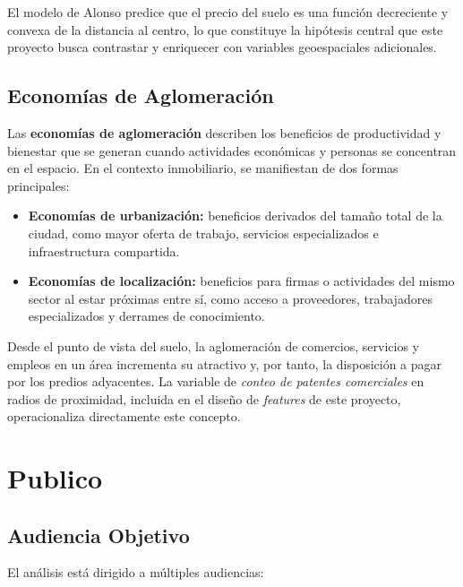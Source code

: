 \documentclass[12pt, letterpaper]{article}
\begin{document}
El modelo de Alonso predice que el precio del suelo es una función decreciente
y convexa de la distancia al centro, lo que constituye la hipótesis central que
este proyecto busca contrastar y enriquecer con variables geoespaciales
adicionales.

\subsection{Economías de Aglomeración}

Las \textbf{economías de aglomeración} describen los beneficios de productividad
y bienestar que se generan cuando actividades económicas y personas se concentran
en el espacio. En el contexto inmobiliario, se manifiestan de dos formas
principales:

\begin{itemize}[leftmargin=1.5em, itemsep=0.3em]
  \item \textbf{Economías de urbanización:} beneficios derivados del tamaño
        total de la ciudad, como mayor oferta de trabajo, servicios especializados
        e infraestructura compartida.
  \item \textbf{Economías de localización:} beneficios para firmas o actividades
        del mismo sector al estar próximas entre sí, como acceso a proveedores,
        trabajadores especializados y derrames de conocimiento.
\end{itemize}

Desde el punto de vista del suelo, la aglomeración de comercios, servicios y
empleos en un área incrementa su atractivo y, por tanto, la disposición a pagar
por los predios adyacentes. La variable de \textit{conteo de patentes
comerciales} en radios de proximidad, incluida en el diseño de \textit{features}
de este proyecto, operacionaliza directamente este concepto.

\section{Publico}

\subsection{Audiencia Objetivo}

El análisis está dirigido a múltiples audiencias:
\end{document}
